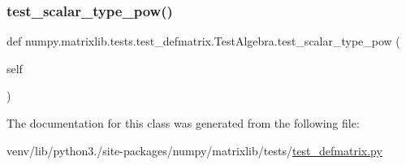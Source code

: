 \subsubsection{\texorpdfstring{test\+\_\+scalar\+\_\+type\+\_\+pow()}{test\_scalar\_type\_pow()}}
{\footnotesize\ttfamily def numpy.\+matrixlib.\+tests.\+test\+\_\+defmatrix.\+Test\+Algebra.\+test\+\_\+scalar\+\_\+type\+\_\+pow (\begin{DoxyParamCaption}\item[{}]{self }\end{DoxyParamCaption})}



The documentation for this class was generated from the following file\+:\begin{DoxyCompactItemize}
\item 
venv/lib/python3./site-\/packages/numpy/matrixlib/tests/\hyperlink{test__defmatrix_8py}{test\+\_\+defmatrix.\+py}\end{DoxyCompactItemize}
